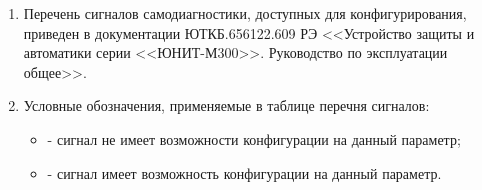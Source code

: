 \areaset{267mm}{180mm}
\fancyheadoffset{0pt} %


\begin{landscape}

\setlength{\footskip}{15.5pt}

\color{black}

\begin{enumerate}[label=\ref{app:signals}.\arabic*] %
  \item Перечень сигналов самодиагностики, доступных для конфигурирования, приведен в документации ЮТКБ.656122.609 РЭ <<Устройство защиты и автоматики серии <<ЮНИТ-М300>>. Руководство по эксплуатации общее>>.
  \item Условные обозначения, применяемые в таблице перечня сигналов:
  \begin{itemize}
    \item[$\text{(--)}$] { - сигнал не имеет возможности конфигурации на данный параметр;}
    \item[$\text{(+)}$] { - сигнал имеет возможность конфигурации на данный параметр.}
  \end{itemize}
\end{enumerate}

\small %
\begin{longtable}{
>{\centering\arraybackslash}m{6.0cm}
|>{\centering\arraybackslash}m{3.45cm}
|>{\centering\arraybackslash}m{2cm}
|>{\centering\arraybackslash}m{2cm}
|>{\centering\arraybackslash}m{2cm}
|>{\centering\arraybackslash}m{2cm}
|>{\centering\arraybackslash}m{2cm}
|>{\centering\arraybackslash}m{2cm}
|>{\centering\arraybackslash}m{2.107cm}
}


\end{longtable}
\end{landscape}
